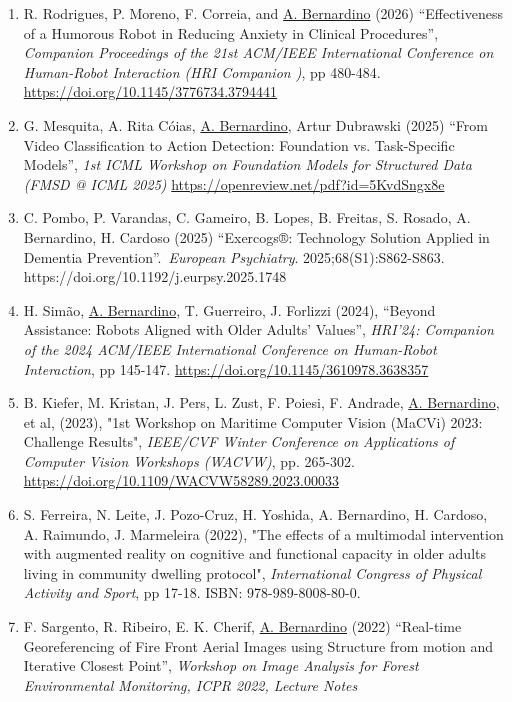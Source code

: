 \documentclass[
]{article}
\begin{document}
\begin{enumerate}
\def\labelenumi{\arabic{enumi}.}
\item
  R. Rodrigues, P. Moreno, F. Correia, and \ul{A. Bernardino} (2026)
  ``Effectiveness of a Humorous Robot in Reducing Anxiety in Clinical
  Procedures'', \emph{Companion Proceedings of the 21st ACM/IEEE
  International Conference on Human-Robot Interaction (HRI Companion
  )}, pp 480-484.
  \url{https://doi.org/10.1145/3776734.3794441}
\item
  G. Mesquita, A. Rita Cóias, \ul{A. Bernardino}, Artur Dubrawski (2025)
  ``From Video Classification to Action Detection: Foundation vs.
  Task-Specific Models'', \emph{1st ICML Workshop on Foundation Models
  for Structured Data (FMSD @ ICML 2025)}
  \url{https://openreview.net/pdf?id=5KvdSngx8e}
\item
  C. Pombo, P. Varandas, C. Gameiro, B. Lopes, B. Freitas, S. Rosado, A.
  Bernardino, H. Cardoso (2025) ``Exercogs®: Technology Solution Applied
  in Dementia Prevention''.~\emph{European Psychiatry}.
  2025;68(S1):S862-S863. https://doi.org/10.1192/j.eurpsy.2025.1748
\item
  H. Simão, \ul{A. Bernardino}, T. Guerreiro, J. Forlizzi (2024),
  ``Beyond Assistance: Robots Aligned with Older Adults' Values'',
  \emph{HRI'24: Companion of the 2024 ACM/IEEE International Conference
  on Human-Robot Interaction}, pp 145-147.
  \url{https://doi.org/10.1145/3610978.3638357}
\item
  B. Kiefer, M. Kristan, J. Pers, L. Zust, F. Poiesi, F. Andrade, \ul{A.
  Bernardino}, et al, (2023), "1st Workshop on Maritime Computer Vision
  (MaCVi) 2023: Challenge Results", \emph{IEEE/CVF Winter Conference on
  Applications of Computer Vision Workshops (WACVW)}, pp. 265-302.
  \url{https://doi.org/10.1109/WACVW58289.2023.00033}
\item
  S. Ferreira, N. Leite, J. Pozo-Cruz, H. Yoshida, A. Bernardino, H.
  Cardoso, A. Raimundo, J. Marmeleira (2022), "The effects of a
  multimodal intervention with augmented reality on cognitive and
  functional capacity in older adults living in community dwelling
  protocol", \emph{International Congress of Physical Activity and
  Sport}, pp 17-18. ISBN: 978-989-8008-80-0.
\item
  F. Sargento, R. Ribeiro, E. K. Cherif, \ul{A. Bernardino} (2022)
  ``Real-time Georeferencing of Fire Front Aerial Images using Structure
  from motion and Iterative Closest Point'', \emph{Workshop on Image
  Analysis for Forest Environmental Monitoring, ICPR 2022, Lecture Notes
}
\end{enumerate}
\end{document}
